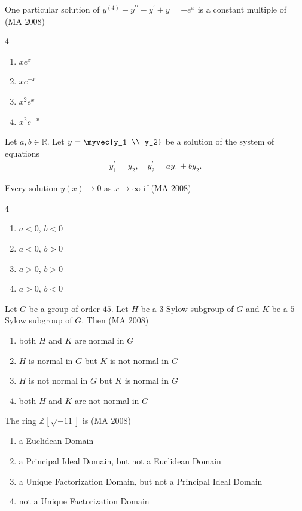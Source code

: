 \item
One particular solution of $y^{(4)} - y^{\prime \prime} - y^{\prime} + y = -e^x$ is a constant multiple of
\hfill (MA 2008)
\begin{multicols}{4}
\begin{enumerate}
    \item $x e^x$
    \item $x e^{-x}$
    \item $x^2 e^x$
    \item $x^2 e^{-x}$
\end{enumerate}
\end{multicols}


\item
Let $a, b \in \mathbb{R}$. Let $y = \myvec{y_1 \\ y_2}$ be a solution of the system of equations
\begin{align}
    y_1^{\prime} = y_2, \quad y_2^{\prime} = a y_1 + b y_2.
\end{align}

Every solution $y(x) \to 0$ as $x \to \infty$ if
\hfill (MA 2008)
\begin{multicols}{4}
\begin{enumerate}
    \item $a < 0$, $b < 0$
    \item $a < 0$, $b > 0$
    \item $a > 0$, $b > 0$
    \item $a > 0$, $b < 0$
\end{enumerate}    
\end{multicols}


\item
Let $G$ be a group of order $45$. Let $H$ be a $3$-Sylow subgroup of $G$ and $K$ be a $5$-Sylow subgroup of $G$. Then
\hfill (MA 2008)
\begin{enumerate}
    \item both $H$ and $K$ are normal in $G$
    \item $H$ is normal in $G$ but $K$ is not normal in $G$
    \item $H$ is not normal in $G$ but $K$ is normal in $G$
    \item both $H$ and $K$ are not normal in $G$
\end{enumerate}

\item
The ring $\mathbb{Z}[\sqrt{-11}]$ is
\hfill (MA 2008)
\begin{enumerate}
    \item a Euclidean Domain
    \item a Principal Ideal Domain, but not a Euclidean Domain
    \item a Unique Factorization Domain, but not a Principal Ideal Domain
    \item not a Unique Factorization Domain
\end{enumerate}


